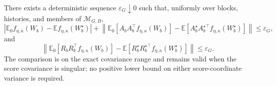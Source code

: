 There exists a deterministic sequence \(\varepsilon_G\downarrow0\) such that, uniformly over blocks, histories, and members of \(\mathcal M_{G,B}\),
\[
\left|\mathbb E_0f_{\eta,\kappa}(W_b)-\mathbb Ef_{\eta,\kappa}(W_b^\star)\right|
+\left\|\mathbb E_0[A_bA_b^\top f_{\eta,\kappa}(W_b)]-\mathbb E[A_b^\star A_b^{\star\top}f_{\eta,\kappa}(W_b^\star)]\right\|
\leq\varepsilon_G,
\]
and
\[
\left\|\mathbb E_0[R_bR_b^\top f_{\eta,\kappa}(W_b)]-\mathbb E[R_b^\star R_b^{\star\top}f_{\eta,\kappa}(W_b^\star)]\right\|
\leq\varepsilon_G.
\]
The comparison is on the exact covariance range and remains valid when the score covariance is singular; no positive lower bound on either score-coordinate variance is required.